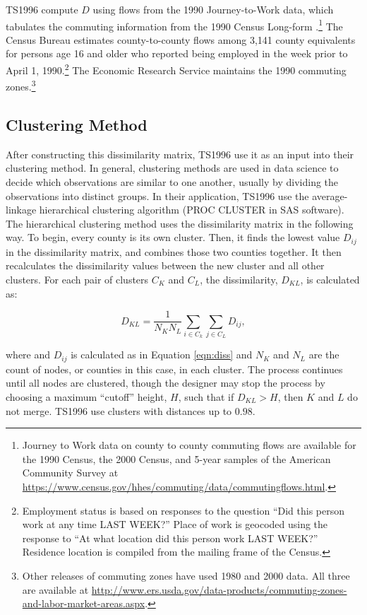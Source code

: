 TS1996 compute $D$ using flows from the 1990 Journey-to-Work data, which tabulates the commuting information from the 1990 Census Long-form \citep{Census1990jtw}.\footnote{Journey to Work data on county to county commuting flows are available for the 1990 Census, the 2000 Census, and 5-year samples of the American Community Survey at \url{https://www.census.gov/hhes/commuting/data/commutingflows.html}.} The Census Bureau estimates county-to-county flows among 3,141 county equivalents for persons age 16 and older who reported being employed in the week prior to April 1, 1990.\footnote{Employment status is based on responses to the question ``Did this person work at any time LAST WEEK?'' Place of work is geocoded using the response to ``At what location did this person work LAST WEEK?'' Residence location is compiled from the mailing frame of the Census.} The Economic Research Service maintains the 1990 commuting zones.\footnote{Other releases of commuting zones have used 1980 and 2000 data. All three are available at \url{http://www.ers.usda.gov/data-products/commuting-zones-and-labor-market-areas.aspx}.} 

\subsection{Clustering Method}

After constructing this dissimilarity matrix, TS1996 use it as an input into their clustering method. In general, clustering methods are used in data science to decide which observations are similar to one another, usually by dividing the observations into distinct groups. In their application, TS1996 use the average-linkage hierarchical clustering algorithm (PROC CLUSTER in SAS software). The hierarchical clustering method uses the dissimilarity matrix in the following way. To begin, every county is its own cluster. Then, it finds the lowest value $D_{ij}$ in the dissimilarity matrix, and combines those two counties together. It then recalculates the dissimilarity values between the new cluster and all other clusters. For each pair of clusters $C_K$ and $C_L$, the dissimilarity, $D_{KL}$, is calculated as:

\begin{equation}
D_{KL} = \frac{1}{N_K N_L} \sum_{i \in C_k} \sum_{j \in C_L} D_{ij},
\end{equation}

where and $D_{ij}$ is calculated as in Equation \ref{eqn:diss} and $N_K$ and $N_L$ are the count of nodes, or counties in this case, in each cluster. The process continues until all nodes are clustered, though the designer may stop the process by choosing a maximum ``cutoff'' height, $H$, such that if $D_{KL}>H$, then $K$ and $L$ do not merge. TS1996 use clusters with distances up to $0.98$.

